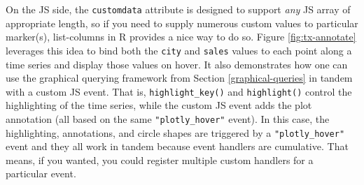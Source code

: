 \documentclass[
  12pt,
]{krantz}
\newenvironment{Shaded}{\begin{snugshade}}{\end{snugshade}}
\newcommand{\DataTypeTok}[1]{\textcolor[rgb]{0.13,0.29,0.53}{#1}}
\newcommand{\KeywordTok}[1]{\textcolor[rgb]{0.13,0.29,0.53}{\textbf{#1}}}
\newcommand{\NormalTok}[1]{#1}
\newcommand{\OperatorTok}[1]{\textcolor[rgb]{0.81,0.36,0.00}{\textbf{#1}}}
\newcommand{\StringTok}[1]{\textcolor[rgb]{0.31,0.60,0.02}{#1}}
\begin{document}
On the JS side, the \texttt{customdata} attribute is designed to support \emph{any} JS array of appropriate length, so if you need to supply numerous custom values to particular marker(s), list-columns in R provides a nice way to do so. Figure \ref{fig:tx-annotate} leverages this idea to bind both the \texttt{city} and \texttt{sales} values to each point along a time series and display those values on hover. It also demonstrates how one can use the graphical querying framework from Section \ref{graphical-queries} in tandem with a custom JS event. That is, \texttt{highlight\_key()} and \texttt{highlight()} control the highlighting of the time series, while the custom JS event adds the plot annotation (all based on the same \texttt{"plotly\_hover"} event). In this case, the highlighting, annotations, and circle shapes are triggered by a \texttt{"plotly\_hover"} event and they all work in tandem because event handlers are cumulative. That means, if you wanted, you could register multiple custom handlers for a particular event.

\begin{Shaded}
\end{Shaded}
\end{document}
